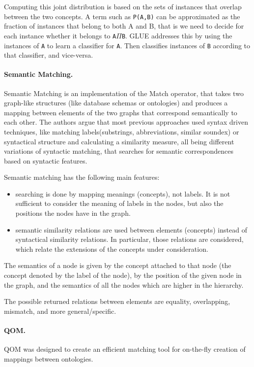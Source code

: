 Computing this joint distribution is based on the sets of instances that
overlap between the two concepts. A term such as
\texttt{P(A,B)} can be approximated as the fraction of
instances that belong to both A and B, that is we need to decide for
each instance whether it belongs to \texttt{A${\Pi}$B}.
GLUE addresses this by using the instances of \texttt{A}
to learn a classifier for \texttt{A}. Then classifies
instances of \texttt{B} according to that classifier, and
vice-versa.

\paragraph{Semantic Matching.}
Semantic Matching \cite{giunchiglia2004semantic_matching} is an implementation of
the Match operator, that takes two graph-like structures (like database
schemas or ontologies) and produces a mapping between elements of the
two graphs that correspond semantically to each other. The authors
argue that most previous approaches used syntax driven techniques, like
matching labels(substrings, abbreviations, similar soundex) or
syntactical structure and calculating a similarity measure, all being
different variations of syntactic matching, that searches for semantic
correspondences based on syntactic features. 

Semantic matching has the following main features: 

\begin{itemize}
\item searching is done by mapping meanings (concepts), not labels. It
is not sufficient to consider the meaning of labels in the nodes, but
also the positions the nodes have in the graph. 
\item semantic similarity relations are used between elements (concepts)
instead of syntactical similarity relations. In particular, those
relations are considered, which relate the extensions of the concepts
under consideration. 
\end{itemize}
The semantics of a node is given by the concept attached to that node
(the concept denoted by the label of the node), by the position of the
given node in the graph, and the semantics of all the nodes which are
higher in the hierarchy. 

The possible returned relations between elements are equality,
overlapping, mismatch, and more general/specific. 

\paragraph{QOM.}
QOM \cite{ehrig2004qom} was designed to create an efficient matching
tool for on-the-fly creation of mappings between ontologies. 

